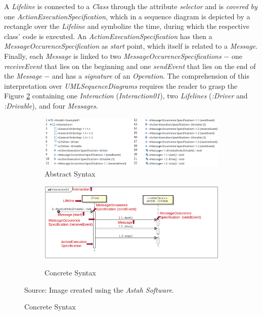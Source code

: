 \documentclass[tuberlin,cic,tc,english,noabntcite,oneside]{iiufrgs}
\begin{document}
A \emph{Lifeline} is connected to a \emph{Class} through the attribute \emph{selector} and is \emph{covered by} one \emph{ActionExecutionSpecification}, which in a sequence diagram is depicted by a rectangle over the \emph{Lifeline} and symbolize the time, during which the respective class' code is executed. An \emph{ActionExecutionSpecification} has then a \emph{MessageOccurenceSpecification} as \emph{start} point, which itself is related to a \emph{Message}. Finally, each \emph{Message} is linked to two \emph{MessageOccurenceSpecifications} $-$ one \emph{receiveEvent} that lies on the beginning and one \emph{sendEvent} that lies on the end of the \emph{Message} $-$ and has a \emph{signature} of an \emph{Operation}. The comprehension of this interpretation over \emph{UMLSequenceDiagrams} requires the reader to grasp the Figure \ref{fig:uml_metamodel_sequence_example} containing one \emph{Interaction} (\emph{Interaction01}), two \emph{Lifelines} (\emph{:Driver} and \emph{:Drivable}), and four \emph{Messages}.

\begin{figure}[H]
    \caption{An example of a model \emph{UMLSequenceDiagram} visualized in two different ways}
    \centering
   	\begin{subfigure}[h]{\textwidth}
   		\caption{Abstract Syntax}
   		\includegraphics[width=\textwidth]{umlSequenceDiagramExample01}
   	\end{subfigure}
   	\begin{subfigure}[h]{\textwidth}
   		\caption{Concrete Syntax}
   		\includegraphics[width=\textwidth]{umlSequenceDiagramExample01_Diagram}
   		\label{fig:uml_metamodel_sequence_example_diagram}
   	\end{subfigure}
    \label{fig:uml_metamodel_sequence_example}
    Source: Image created using the \emph{Astah Software}.
\end{figure}
\end{document}
